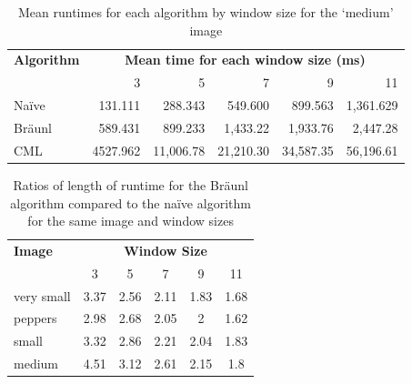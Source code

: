 \begin{table}
\centering
\caption{Mean runtimes for each algorithm by window size for the `medium' image}
\label{tab:medium}
\begin{tabular}{@{}lrrrrr@{}}
\toprule
\multicolumn{1}{c}{\textbf{Algorithm}} & \multicolumn{5}{c}{\textbf{Mean time for each window size (ms)}}      \\
\multicolumn{1}{r}{}                   & \multicolumn{1}{r}{3} & 5         & 7         & 9         & 11        \\ \midrule
Naïve                                  & 131.111               & 288.343   & 549.600   & 899.563   & 1,361.629 \\
Bräunl                                 & 589.431
               & 899.233   & 1,433.22  & 1,933.76  & 2,447.28  \\
CML                                    & 4527.962
               & 11,006.78 & 21,210.30 & 34,587.35 & 56,196.61 \\ \bottomrule
\end{tabular}
\end{table}

\begin{table}
\centering
\caption{Ratios of length of runtime for the Bräunl algorithm compared to the naïve algorithm for the same image and window sizes}
\label{tab:ratbraun}
\begin{tabular}{@{}lccccc@{}}
\toprule
\textbf{Image} & \multicolumn{5}{c}{\textbf{Window Size}} \\
               & 3      & 5      & 7      & 9     & 11    \\ \midrule
very small     & 3.37   & 2.56   & 2.11   & 1.83  & 1.68  \\
peppers        & 2.98   & 2.68   & 2.05   & 2     & 1.62  \\
small          & 3.32   & 2.86   & 2.21   & 2.04  & 1.83  \\
medium         & 4.51   & 3.12   & 2.61   & 2.15  & 1.8   \\ \bottomrule
\end{tabular}
\end{table}

